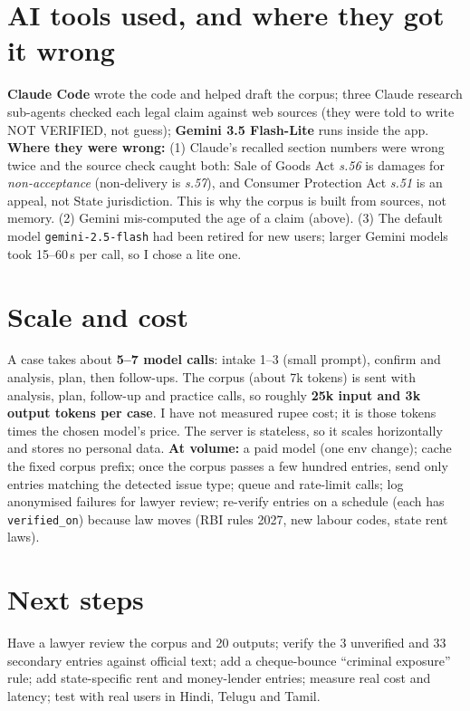 \documentclass[9pt,a4paper]{extarticle}
\begin{document}
\section{AI tools used, and where they got it wrong}
\textbf{Claude Code} wrote the code and helped draft the corpus; three Claude research sub-agents checked each legal claim against web sources (they were told to write NOT VERIFIED, not guess); \textbf{Gemini 3.5 Flash-Lite} runs inside the app. \textbf{Where they were wrong:} (1) Claude's recalled section numbers were wrong twice and the source check caught both: Sale of Goods Act \emph{s.56} is damages for \emph{non-acceptance} (non-delivery is \emph{s.57}), and Consumer Protection Act \emph{s.51} is an appeal, not State jurisdiction. This is why the corpus is built from sources, not memory. (2) Gemini mis-computed the age of a claim (above). (3) The default model \texttt{gemini-2.5-flash} had been retired for new users; larger Gemini models took 15--60\,s per call, so I chose a lite one.

\section{Scale and cost}
A case takes about \textbf{5--7 model calls}: intake 1--3 (small prompt), confirm and analysis, plan, then follow-ups. The corpus (about 7k tokens) is sent with analysis, plan, follow-up and practice calls, so roughly \textbf{25k input and 3k output tokens per case}. I have not measured rupee cost; it is those tokens times the chosen model's price. The server is stateless, so it scales horizontally and stores no personal data. \textbf{At volume:} a paid model (one env change); cache the fixed corpus prefix; once the corpus passes a few hundred entries, send only entries matching the detected issue type; queue and rate-limit calls; log anonymised failures for lawyer review; re-verify entries on a schedule (each has \texttt{verified\_on}) because law moves (RBI rules 2027, new labour codes, state rent laws).

\section{Next steps}
Have a lawyer review the corpus and 20 outputs; verify the 3 unverified and 33 secondary entries against official text; add a cheque-bounce ``criminal exposure'' rule; add state-specific rent and money-lender entries; measure real cost and latency; test with real users in Hindi, Telugu and Tamil.
\end{document}
